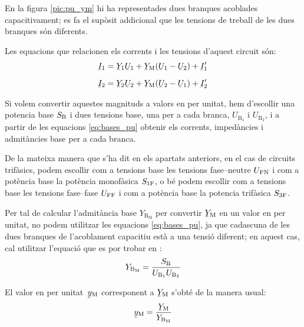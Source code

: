 En la figura \vref{pic:pu_ym} hi ha representades dues branques acoblades capacitivament; es fa el sup\`{o}sit addicional que les tensions de treball de les dues branques s\'{o}n diferents.

\begin{center}
    
    \label{pic:pu_ym}
\end{center}

Les equacions que relacionen els corrents i les tensions d'aquest circuit s\'{o}n:
\begin{subequations}
\begin{align}
    \cmplx{I}_1  &= \cmplx{Y}_1 \cmplx{U}_1 +  \cmplx{Y}\ped{M}(\cmplx{U}_1-\cmplx{U}_2)  + \cmplx{I}'_1   \\[2mm]
    \cmplx{I}_2  &= \cmplx{Y}_2 \cmplx{U}_2 +  \cmplx{Y}\ped{M}(\cmplx{U}_2-\cmplx{U}_1)  + \cmplx{I}'_2
\end{align}
\end{subequations}

Si volem convertir aquestes magnituds a valors en per unitat, hem d'escollir  una potencia base $S_\mathrm{B}$ i dues tensions base, una  per a cada branca, $U_{\text{B}_1}$ i  $U_{\text{B}_2}$, i a partir de les equacions \eqref{eq:bases_pu} obtenir els corrents, imped\`{a}ncies i admit\`{a}ncies base per a cada branca.

De la mateixa manera que s'ha dit en els apartats anteriors, en el cas de circuits trif\`{a}sics, podem escollir com a tensions base les tensions fase--neutre $U_\mathrm{FN}$ i com a pot\`{e}ncia base la pot\`{e}ncia  monof\`{a}sica $S_\mathrm{1F}$, o b\'{e} podem escollir com a tensions base les tensions fase--fase $U_\mathrm{FF}$ i com a pot\`{e}ncia base la potencia trif\`{a}sica $S_\mathrm{3F}$.


Per tal de  calcular l'admit\`{a}ncia base $Y_{\text{B}_\text{M}}$ per convertir $\cmplx{Y}\ped{M}$ en un valor en per unitat, no podem utilitzar les equacions \eqref{eq:bases_pu}, ja que cadascuna de les dues branques de l'acoblament capacitiu est\`{a} a una tensi\'{o} diferent; en aquest cas, cal utilitzar l'equaci\'{o} que es por trobar en \cite{TLE}:
\begin{equation}
    Y_{\text{B}_\text{M}} = \frac{S_\mathrm{B}}{U_{\text{B}_1} U_{\text{B}_2}}
\end{equation}

El valor en per unitat\ $\cmplx{y}\ped{M}$ corresponent a $\cmplx{Y}\ped{M}$ s'obt\'{e} de la manera usual:
\begin{equation}
    \cmplx{y}\ped{M} = \frac{\cmplx{Y}\ped{M}}{Y_{\text{B}_\text{M}}}
\end{equation}


